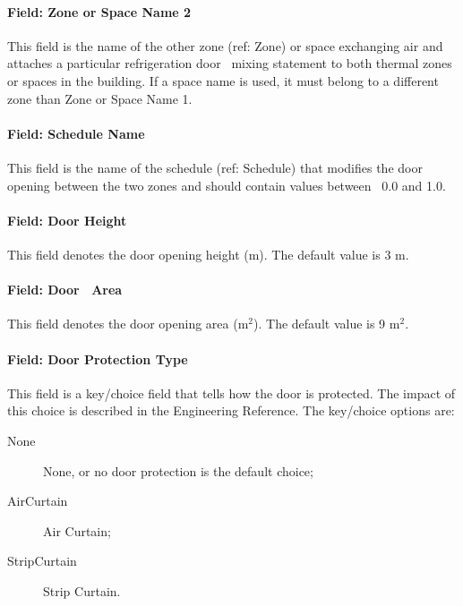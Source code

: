 \paragraph{Field: Zone or Space Name 2}\label{field-zone-2-name}

This field is the name of the other zone (ref: Zone) or space exchanging air and attaches a particular refrigeration door~ mixing statement to both thermal zones or spaces in the building. If a space name is used, it must belong to a different zone than Zone or Space Name 1.

\paragraph{Field: Schedule Name}\label{field-schedule-name-5}

This field is the name of the schedule (ref: Schedule) that modifies the door opening between the two zones and should contain values between~ 0.0 and 1.0.

\paragraph{Field: Door Height}\label{field-door-height}

This field denotes the door opening height (m). The default value is 3 m.

\paragraph{Field: Door~ Area}\label{field-door-area}

This field denotes the door opening area (m\(^{2}\)). The default value is 9 m\(^{2}\).

\paragraph{Field: Door Protection Type}\label{field-door-protection-type}

This field is a key/choice field that tells how the door is protected. The impact of this choice is described in the Engineering Reference. The key/choice options are:

\begin{description}

\item[None] None, or no door protection is the default choice;

\item[AirCurtain] Air Curtain;

\item[StripCurtain] Strip Curtain.

\end{description}

